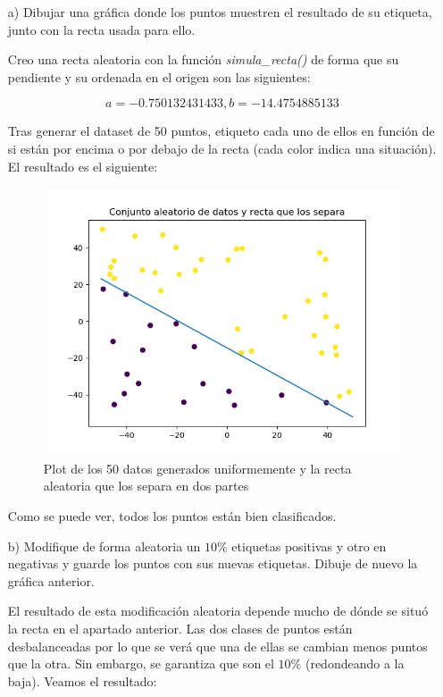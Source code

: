 \begin{itemize}
	\item[a)] Dibujar una gráfica donde los puntos muestren el resultado de su etiqueta, junto con la recta usada para ello.
	
	Creo una recta aleatoria con la función \textit{simula\_recta()} de forma que su pendiente y su ordenada en el origen son las siguientes:
	
	$$a = -0.750132431433, b=-14.4754885133$$
	
	Tras generar el dataset de 50 puntos, etiqueto cada uno de ellos en función de si están por encima o por debajo de la recta (cada color indica una situación). El resultado es el siguiente: 
	
	\begin{figure}[H] %
		\centering
		\includegraphics[scale=0.5]{recta1.png}  %
		\caption{Plot de los 50 datos generados uniformemente y la recta aleatoria que los separa en dos partes} 
		\label{fig:recta1}
	\end{figure}

Como se puede ver, todos los puntos están bien clasificados.

	\item[b)] Modifique de forma aleatoria un $10\%$ etiquetas positivas y otro en negativas y guarde los puntos con sus nuevas etiquetas. Dibuje de nuevo la gráfica anterior.
	
	El resultado de esta modificación aleatoria depende mucho de dónde se situó la recta en el apartado anterior. Las dos clases de puntos están desbalanceadas por lo que se verá que una de ellas se cambian menos puntos que la otra. Sin embargo, se garantiza que son el $10\%$ (redondeando a la baja). Veamos el resultado:
	

\end{itemize}
